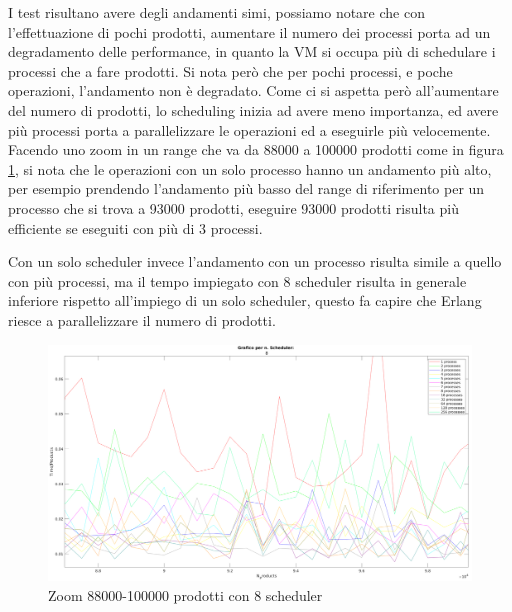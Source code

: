 I test risultano avere degli andamenti simi, possiamo notare che
con l'effettuazione di pochi prodotti, aumentare il numero dei processi
porta ad un degradamento delle performance, in quanto la VM si occupa più
di schedulare i processi che a fare prodotti.
Si nota però che per pochi processi, e poche operazioni, l'andamento
non è degradato. Come ci si aspetta però all'aumentare del numero di
prodotti, lo scheduling inizia ad avere meno importanza,
ed avere più processi porta a parallelizzare le operazioni ed a eseguirle
più velocemente.
Facendo uno zoom in un range che va da 88000 a 100000 prodotti come in
figura \ref{fig:zoom8}, si nota che le operazioni con un solo processo
hanno un andamento più alto, per esempio prendendo l'andamento più basso
del range di riferimento per un processo che si trova a 93000 prodotti,
eseguire 93000 prodotti risulta più efficiente se eseguiti con più di 3
processi.

Con un solo scheduler invece l'andamento con un processo risulta simile
a quello con più processi, ma il tempo impiegato con 8 scheduler risulta
in generale inferiore rispetto all'impiego di un solo scheduler, questo
fa capire che Erlang riesce a parallelizzare il numero di prodotti.


\begin{figure}[!htp]
    \centering
    \includegraphics[keepaspectratio=true,scale=0.30]{images/matlab/zoom_8_crop.png}
	\caption{Zoom 88000-100000 prodotti con 8 scheduler}
  	\label{fig:zoom8}
\end{figure}



	